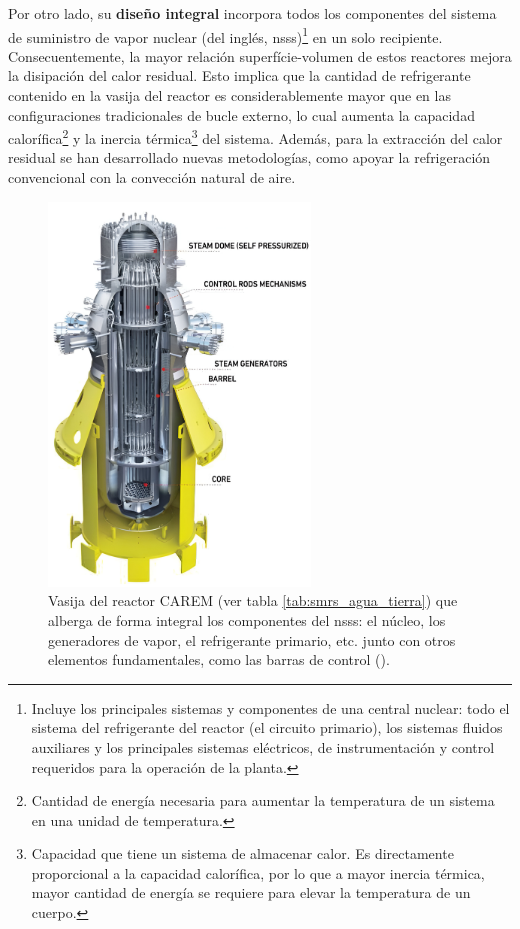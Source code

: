 Por otro lado, su \textbf{diseño integral} incorpora todos los componentes del \gls{sistema de suministro de vapor nuclear} (del inglés, \acrshort{nsss})\footnote{Incluye los principales sistemas y componentes de una central nuclear: todo el sistema del refrigerante del reactor (el circuito primario), los sistemas fluidos auxiliares y los principales sistemas eléctricos, de instrumentación y control requeridos para la operación de la planta.} en un solo recipiente. Consecuentemente, la mayor relación superfície-volumen de estos reactores mejora la disipación del calor residual. Esto implica que la cantidad de refrigerante contenido en la vasija del reactor es considerablemente mayor que en las configuraciones tradicionales de bucle externo, lo cual aumenta la capacidad calorífica\footnote{Cantidad de energía necesaria para aumentar la temperatura de un sistema en una unidad de temperatura.} y la inercia térmica\footnote{Capacidad que tiene un sistema de almacenar calor. Es directamente proporcional a la capacidad calorífica, por lo que a mayor inercia térmica, mayor cantidad de energía se requiere para elevar la temperatura de un cuerpo.} del sistema. Además, para la extracción del calor residual se han desarrollado nuevas metodologías, como apoyar la refrigeración convencional con la convección natural de aire.

\begin{figure}[h]
  \centering
  \includegraphics[width=0.62\textwidth]{content/figures/carem.jpeg}
  \caption{Vasija del reactor CAREM (ver tabla \ref{tab:smrs_agua_tierra}) que alberga de forma integral los componentes del \acrshort{nsss}: el núcleo, los generadores de vapor, el refrigerante primario, etc. junto con otros elementos fundamentales, como las barras de control (\cite{iaea_smr_booklet_2022}).}
  \label{fig:carem}
\end{figure}


